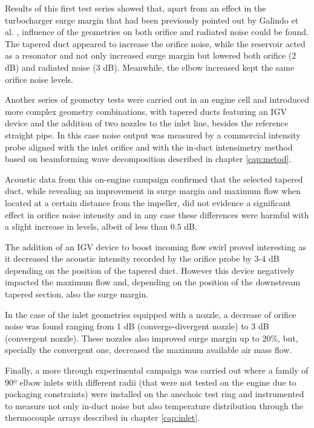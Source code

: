 Results of this first test series showed that, apart from an effect in the turbocharger surge margin that had been previously pointed out by Galindo et al. \cite{galindo2007potential}, influence of the geometries on both orifice and radiated noise could be found. The tapered duct appeared to increase the orifice noise, while the reservoir acted as a resonator and not only increased surge margin but lowered both orifice (2 dB) and radiated noise (3 dB). Meanwhile, the elbow increased kept the same orifice noise levels.

Another series of geometry tests were carried out in an engine cell and introduced more complex geometry combinations, with tapered ducts featuring an IGV device and the addition of two nozzles to the inlet line, besides the reference straight pipe. In this case noise output was measured by a commercial intensity probe aligned with the inlet orifice and with the in-duct intensimetry method based on beamforming wave decomposition described in chapter \ref{cap:metod}.

Acoustic data from this on-engine campaign confirmed that the selected tapered duct, while revealing an improvement in surge margin and maximum flow when located at a certain distance from the impeller, did not evidence a significant effect in orifice noise intensity and in any case these differences were harmful with a slight increase in levels, albeit of less than 0.5 dB.

The addition of an IGV device to boost incoming flow swirl proved interesting as it decreased the acoustic intensity recorded by the orifice probe by 3-4 dB depending on the position of the tapered duct. However this device negatively impacted the maximum flow and, depending on the position of the downstream tapered section, also the surge margin. 

In the case of the inlet geometries equipped with a nozzle, a decrease of orifice noise was found ranging from 1 dB (converge-divergent nozzle) to 3 dB (convergent nozzle). These nozzles also improved surge margin up to 20\%, but, specially the convergent one, decreased the maximum available air mass flow.

Finally, a more through experimental campaign was carried out where a family of 90º elbow inlets with different radii (that were not tested on the engine due to packaging constraints) were installed on the anechoic test ring and instrumented to measure not only in-duct noise but also temperature distribution through the thermocouple arrays described in chapter \ref{cap:inlet}.

